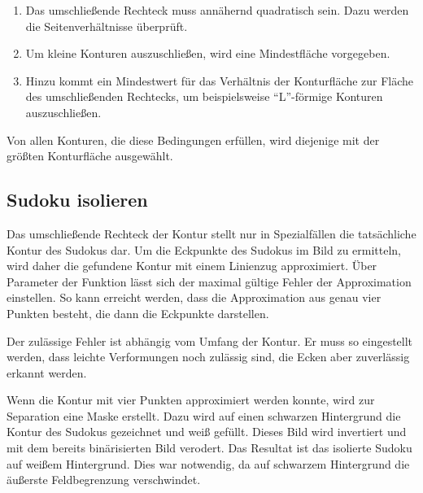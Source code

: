 \begin{enumerate}
    \item Das umschließende Rechteck muss annähernd quadratisch sein. Dazu werden die Seitenverhältnisse überprüft.
    \item Um kleine Konturen auszuschließen, wird eine Mindestfläche vorgegeben.
    \item Hinzu kommt ein Mindestwert für das Verhältnis der Konturfläche zur Fläche des umschließenden Rechtecks, um beispielsweise ``L''-förmige Konturen auszuschließen.
\end{enumerate}

Von allen Konturen, die diese Bedingungen erfüllen, wird diejenige mit der größten Konturfläche ausgewählt.


\subsection{Sudoku isolieren}
Das umschließende Rechteck der Kontur stellt nur in Spezialfällen die tatsächliche Kontur des Sudokus dar.
Um die Eckpunkte des Sudokus im Bild zu ermitteln, wird daher die gefundene Kontur mit einem Linienzug approximiert.
Über Parameter der Funktion lässt sich der maximal gültige Fehler der Approximation einstellen.
So kann erreicht werden, dass die Approximation aus genau vier Punkten besteht, die dann die Eckpunkte darstellen.

Der zulässige Fehler ist abhängig vom Umfang der Kontur.
Er muss so eingestellt werden, dass leichte Verformungen noch zulässig sind, die Ecken aber zuverlässig erkannt werden.

Wenn die Kontur mit vier Punkten approximiert werden konnte, wird zur Separation eine Maske erstellt.
Dazu wird auf einen schwarzen Hintergrund die Kontur des Sudokus gezeichnet und weiß gefüllt.
Dieses Bild wird invertiert und mit dem bereits binärisierten Bild verodert.
Das Resultat ist das isolierte Sudoku auf weißem Hintergrund.
Dies war notwendig, da auf schwarzem Hintergrund die äußerste Feldbegrenzung verschwindet.

